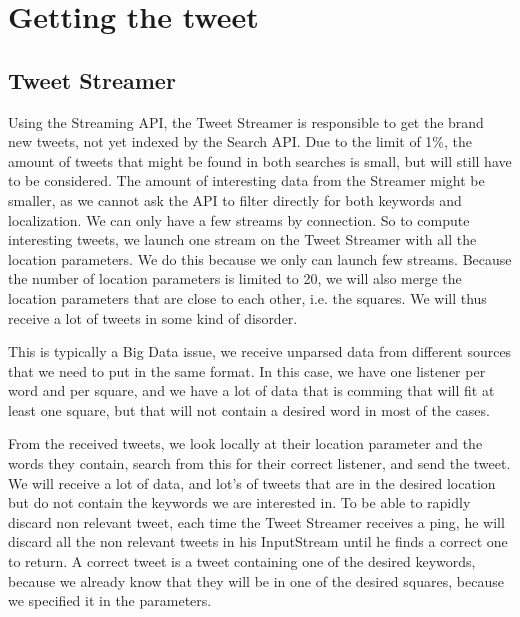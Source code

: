 \section{Getting the tweet}
\subsection{Tweet Streamer}
Using the Streaming API, the Tweet Streamer is responsible to get the brand new tweets, not yet indexed by the Search API. Due to the limit of 1\%, the amount of tweets that might be found in both searches is small, but will still have to be considered. The amount of interesting data from the Streamer might be smaller, as we cannot ask the API to filter directly for both keywords and localization. We can only have a few streams by connection. So to compute interesting tweets, we launch one stream on the Tweet Streamer with all the location parameters. We do this because we only can launch few streams. Because the number of location parameters is limited to 20, we will also merge the location parameters that are close to each other, i.e. the squares. We will thus receive a lot of tweets in some kind of disorder.

This is typically a Big Data issue, we receive unparsed data from different sources that we need to put in the same format. In this case, we have one listener per word and per square, and we have a lot of data that is comming that will fit at least one square, but that will not contain a desired word in most of the cases.

From the received tweets, we look locally at their location parameter and the words they contain, search from this for their correct listener, and send the tweet. We will receive a lot of data, and lot's of tweets that are in the desired location but do not contain the keywords we are interested in. To be able to rapidly discard non relevant tweet, each time the Tweet Streamer receives a ping, he will discard all the non relevant tweets in his InputStream until he finds a correct one to return. A correct tweet is a tweet containing one of the desired keywords, because we already know that they will be in one of the desired squares, because we specified it in the parameters.
